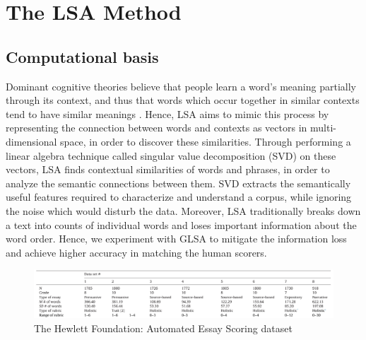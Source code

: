 \documentclass[10pt,letterpaper]{article}
\begin{document}


\section{The LSA Method}

\subsection{Computational basis}

Dominant cognitive theories believe that people learn a word's meaning partially through its context, and thus that words which occur together in similar contexts tend to have similar meanings \cite{kintsch2002potential}. Hence, LSA aims to mimic this process by representing the connection between words and contexts as vectors in multi-dimensional space, in order to discover these similarities. Through performing a linear algebra technique called singular value decomposition (SVD) on these vectors, LSA finds contextual similarities of words and phrases, in order to analyze the semantic connections between them. SVD extracts the semantically useful features required to characterize and understand a corpus, while ignoring the noise which would disturb the data. Moreover, LSA traditionally breaks down a text into counts of individual words and loses important information about the word order. Hence, we experiment with GLSA to mitigate the information loss and achieve higher accuracy in matching the human scorers.

\begin{figure}[ht]
\begin{center}
 \includegraphics[width=\linewidth]{img/DatasetArray.png}
\end{center}
 \caption{The Hewlett Foundation: Automated Essay Scoring dataset \cite{shermis2014state}}
\end{figure}
\end{document}
